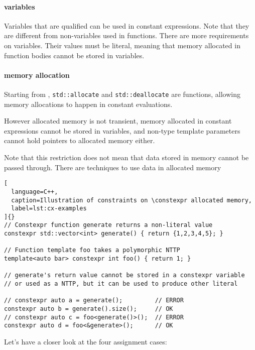 \documentclass[../main]{subfiles}
\begin{document}
\paragraph{\constexpr variables} Variables that are \constexpr qualified can be
used in constant expressions. Note that they are different from
non-\constexpr variables used in \constexpr functions.
There are more requirements on \constexpr variables.
Their values must be literal, meaning that memory allocated in \constexpr
function bodies cannot be stored in \constexpr variables.

\paragraph{
  \constexpr memory allocation
}
Starting from , \lstinline{std::allocate} and \lstinline{std::deallocate}
are \constexpr functions, allowing memory allocations to happen in
constant evaluations.

However \constexpr allocated memory is not transient, \ie memory allocated in
constant expressions cannot be stored in \constexpr variables, and non-type
template parameters cannot hold pointers to \constexpr allocated memory either.

Note that this restriction does not mean that data stored in \constexpr memory
cannot be passed through. There are techniques to use data in \constexpr
allocated memory

\begin{lstlisting}[
  language=C++,
  caption=Illustration of constraints on \constexpr allocated memory,
  label=lst:cx-examples
]{}
// Constexpr function generate returns a non-literal value
constexpr std::vector<int> generate() { return {1,2,3,4,5}; }

// Function template foo takes a polymorphic NTTP
template<auto bar> constexpr int foo() { return 1; }

// generate's return value cannot be stored in a constexpr variable
// or used as a NTTP, but it can be used to produce other literal

// constexpr auto a = generate();         // ERROR
constexpr auto b = generate().size();     // OK
// constexpr auto c = foo<generate()>();  // ERROR
constexpr auto d = foo<&generate>();      // OK
\end{lstlisting}

Let's have a closer look at the four assignment cases:
\end{document}
